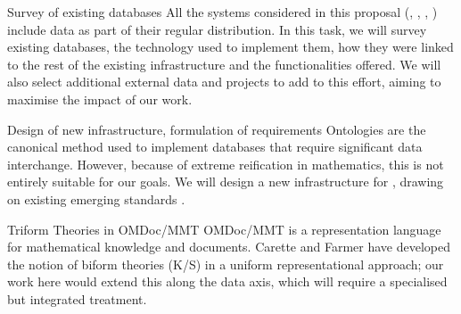 \begin{Workpackage}{\thewpno}
\begin{WPDescription}
\end{WPDescription}

\begin{task}{Survey of existing databases}
\label{task:data_assessment}
All the systems considered in this proposal (\GAP, \Sage, \Pari, \Singular) include data as part of their regular distribution. In this task, we will survey existing databases, the technology used to implement them, how they were linked to the rest of the existing infrastructure and the functionalities offered. We will also select additional external data and projects to add to this effort, aiming to maximise the impact of our work. 
\end{task}

\begin{task}{Design of new infrastructure, formulation of requirements}
\label{task:data_design}
Ontologies are the canonical method used to implement databases that require significant data interchange. However, because of extreme reification in mathematics, this is not entirely suitable for our goals. We will design a new infrastructure for \TheProject, drawing on existing emerging standards . 
\end{task}

\begin{task}{Triform Theories in OMDoc/MMT}
\label{task:data_triform}
OMDoc/MMT is a representation language for mathematical knowledge and documents. Carette and Farmer have developed the notion of biform theories (K/S) in a uniform representational approach; our work here would extend this along the data axis, which will require a specialised but integrated treatment.
\end{task}




\end{Workpackage}
